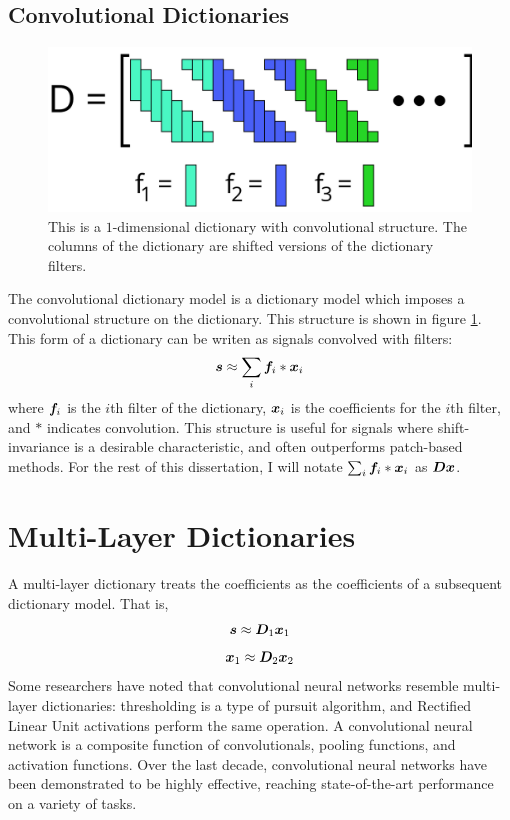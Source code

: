 \subsection{Convolutional Dictionaries}
\begin{figure}
	\includegraphics[width=\textwidth]{figures/convolutionalDictionary.png}
	\caption{This is a $1$-dimensional dictionary with convolutional structure. The columns of the dictionary are shifted versions of the dictionary filters.}
	\label{Figure: Convolutional Dictionary}
\end{figure}
The convolutional dictionary model is a dictionary model which imposes a convolutional structure on the dictionary. This structure is shown in figure \ref{Figure: Convolutional Dictionary}. This form of a dictionary can be writen as signals convolved with filters:
\begin{equation}
\bm{s} \approx \sum_i \bm{f}_i * \bm{x}_i
\end{equation}
%
where $\bm{f}_i$ is the $i$th filter of the dictionary, $\bm{x}_i$ is the coefficients for the $i$th filter, and $*$ indicates convolution. This structure is useful for signals where shift-invariance is a desirable characteristic, and often outperforms patch-based methods. For the rest of this dissertation, I will notate $\sum_i \bm{f}_i * \bm{x}_i$ as $\bm{D}\bm{x}$.

\section{Multi-Layer Dictionaries}
A multi-layer dictionary treats the coefficients as the coefficients of a subsequent dictionary model. That is,
\begin{equation}
\bm{s} \approx \bm{D}_1\bm{x}_1
\end{equation}
\begin{equation}
\bm{x}_1 \approx \bm{D}_2\bm{x}_2
\end{equation}
Some researchers have noted that convolutional neural networks resemble multi-layer dictionaries: thresholding is a type of pursuit algorithm, and Rectified Linear Unit activations perform the same operation. A convolutional neural network is a composite function of convolutionals, pooling functions, and activation functions.  Over the last decade, convolutional neural networks have been demonstrated to be highly effective, reaching state-of-the-art performance on a variety of tasks.


